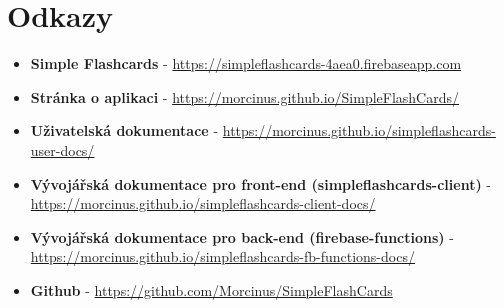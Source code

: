 \documentclass[a4paper,12pt]{article}
\begin{document}
\section{Odkazy}
\begin{itemize}
\item \textbf{Simple Flashcards} - \href{https://simpleflashcards-4aea0.firebaseapp.com}{https://simpleflashcards-4aea0.firebaseapp.com}
\item \textbf{Stránka o aplikaci} - \href{https://morcinus.github.io/SimpleFlashCards/}{https://morcinus.github.io/SimpleFlashCards/}
\item \textbf{Uživatelská dokumentace} - \href{https://morcinus.github.io/simpleflashcards-user-docs/}{https://morcinus.github.io/simpleflashcards-user-docs/}
\item \textbf{Vývojářská dokumentace pro front-end (simpleflashcards-client)} - \href{https://morcinus.github.io/simpleflashcards-client-docs/}{https://morcinus.github.io/simpleflashcards-client-docs/}
\item \textbf{Vývojářská dokumentace pro back-end (firebase-functions)} - \href{https://morcinus.github.io/simpleflashcards-fb-functions-docs/}{https://morcinus.github.io/simpleflashcards-fb-functions-docs/}
\item \textbf{Github} - \href{https://github.com/Morcinus/SimpleFlashCards}{https://github.com/Morcinus/SimpleFlashCards}
\end{itemize}
\end{document}
